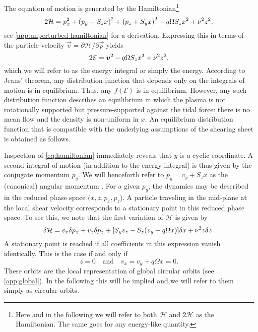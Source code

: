 \documentclass[aps,pre,notitlepage,amsmath,amssymb,amsfonts,nobibnotes,nofootinbib,superscriptaddress]{revtex4-1}
\begin{document}
The equation of motion  is generated by the
Hamiltonian\footnote{Here and in the following we will refer to both
  $\mathcal{H}$ and $2\mathcal{H}$ as the Hamiltonian. The same goes for any
  energy-like quantity.}
\begin{equation}
  \label{eq:hamiltonian}
  2\mathcal{H} = p_x^2 + {(p_y - S_z x)}^2 + {(p_z + S_y x)}^2
  - q\Omega S_z x^2 + \vfreq^2 z^2,
\end{equation}
see \cref{app:unperturbed-hamiltonian} for a derivation. Expressing this in
terms of the particle velocity $\vec{v}=\partial\mathcal{H}/\partial\vec{p}$
yields
\begin{equation}
  \label{eq:energy-integral}
  2\mathcal{E} = \vec{v}^2 - q\Omega S_z x^2 + \vfreq^2 z^2,
\end{equation}
which we will refer to as the energy integral or simply the energy. According
to Jeans' theorem, any distribution function that depends only on the
integrals of motion is in equilibrium. Thus, any $f(\mathcal{E})$ is in
equilibrium. However, any such distribution function describes an equilibrium
in which the plasma is not rotationally supported but pressure-supported
against the tidal force: there is no mean flow and the density is non-uniform
in $x$. An equilibrium distribution function that is compatible with the
underlying assumptions of the shearing sheet is obtained as follows.

Inspection of \cref{eq:hamiltonian} immediately reveals that $y$ is a cyclic
coordinate. A second integral of motion (in addition to the energy integral)
is thus given by the conjugate momentum $p_y$. We will henceforth refer to
$p_y=v_y+S_z{}x$ as the (canonical) angular momentum
\citep[cf.][]{Wisdom1988}. For a given $p_y$, the dynamics may be described in
the reduced phase space $(x,z,p_x,p_z$). A particle traveling in the mid-plane
at the local shear velocity  corresponds to a
stationary point in this reduced phase space. To see this, we note that the
first variation of $\mathcal{H}$ is given by
\begin{equation}
  \delta\mathcal{H} = v_x\delta p_x + v_z\delta p_z
  + [S_y v_z - S_z(v_y + q\Omega x)]\delta x + \nu^2 z\delta z.
\end{equation}
A stationary point is reached if all coefficients in this expression vanish
identically. This is the case if and only if
\begin{equation}
  z = 0 \quad\textrm{and}\quad v_x = v_y + q\Omega x = 0.
\end{equation}
These orbits are the local representation of global circular orbits (see
\cref{app:global}). In the following this will be implied and we will refer to
them simply as circular orbits.
\end{document}
